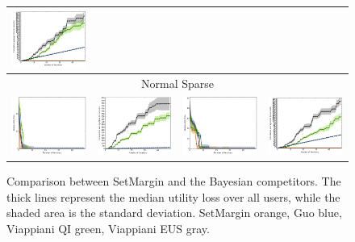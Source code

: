 \documentclass{article}
\renewcommand\[{\begin{equation}}
\renewcommand\]{\end{equation}}
\begin{document}
\begin{figure}[b]
{\begin{tabular}{cccc}
        \includegraphics[width=10em]{figures/synthetic_vs_others_4_uniform_sparse_per_iter_time}
        \\
        \hline
        \multicolumn{4}{c}{{\sc Normal Sparse}}
        \\
        \includegraphics[width=10em]{figures/synthetic_vs_others_3_normal_sparse_per_iter_loss} &
        \includegraphics[width=10em]{figures/synthetic_vs_others_3_normal_sparse_per_iter_time} &
        \includegraphics[width=10em]{figures/synthetic_vs_others_4_normal_sparse_per_iter_loss} &
        \includegraphics[width=10em]{figures/synthetic_vs_others_4_normal_sparse_per_iter_time}
        \\
        \hline
    \end{tabular}
    }
    \caption{\label{fig:comparison} Comparison between {\sc SetMargin} and the
    Bayesian competitors. The thick lines represent the median utility loss
    over all users, while the shaded area is the standard deviation. {\sc
    SetMargin} orange, Guo blue, Viappiani QI green, Viappiani EUS gray.}
\end{figure}
\end{document}

